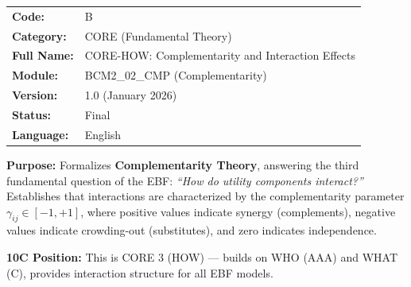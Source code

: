 %
%
%


\begin{tcolorbox}[colback=gray!5!white, colframe=gray!75!black,
    title=Appendix Header: B CORE-HOW]

\begin{tabular}{@{}ll@{}}
\textbf{Code:} & B \\
\textbf{Category:} & CORE (Fundamental Theory) \\
\textbf{Full Name:} & CORE-HOW: Complementarity and Interaction Effects \\
\textbf{Module:} & BCM2\_02\_CMP (Complementarity) \\
\textbf{Version:} & 1.0 (January 2026) \\
\textbf{Status:} & Final \\
\textbf{Language:} & English \\
\end{tabular}

\vspace{0.5em}
\textbf{Purpose:} Formalizes \textbf{Complementarity Theory}, answering the
third fundamental question of the EBF: \textit{``How do utility components interact?''}
Establishes that interactions are characterized by the complementarity parameter
$\gamma_{ij} \in [-1, +1]$, where positive values indicate synergy (complements),
negative values indicate crowding-out (substitutes), and zero indicates independence.

\textbf{10C Position:} This is CORE 3 (HOW) --- builds on WHO (AAA) and WHAT (C),
provides interaction structure for all EBF models.

\end{tcolorbox}

